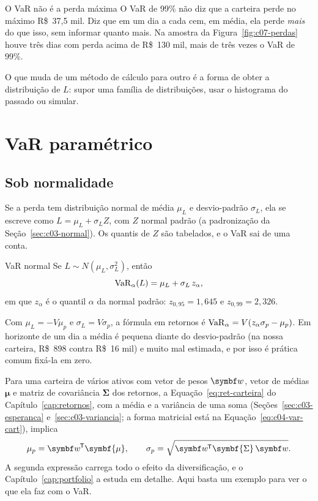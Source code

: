 \begin{armadilha}{O VaR não é a perda máxima}
O VaR de 99\% não diz que a carteira perde no máximo R\$~37,5 mil. Diz que em um dia a cada cem, em média, ela perde \emph{mais} do que isso, sem informar quanto mais. Na amostra da Figura~\ref{fig:c07-perdas} houve três dias com perda acima de R\$~130 mil, mais de três vezes o VaR de 99\%.
\end{armadilha}

O que muda de um método de cálculo para outro é a forma de obter a distribuição de $L$: supor uma família de distribuições, usar o histograma do passado ou simular.

\section{VaR paramétrico}
\label{sec:c07-param}

\subsection{Sob normalidade}

Se a perda tem distribuição normal de média $\mu_L$ e desvio-padrão $\sigma_L$, ela se escreve como $L = \mu_L + \sigma_L Z$, com $Z$ normal padrão (a padronização da Seção~\ref{sec:c03-normal}). Os quantis de $Z$ são tabelados, e o VaR sai de uma conta.

\begin{resultado}{VaR normal}
Se $L \sim N(\mu_L, \sigma_L^2)$, então
\begin{equation}
  \operatorname{VaR}_\alpha(L) = \mu_L + \sigma_L\, z_\alpha ,
  \label{eq:c07-var-normal}
\end{equation}
em que $z_\alpha$ é o quantil $\alpha$ da normal padrão: $z_{0,95} = 1,645$ e $z_{0,99} = 2,326$.
\end{resultado}

Com $\mu_L = -V\mu_p$ e $\sigma_L = V\sigma_p$, a fórmula em retornos é $\operatorname{VaR}_\alpha = V(z_\alpha \sigma_p - \mu_p)$. Em horizonte de um dia a média é pequena diante do desvio-padrão (na nossa carteira, R\$~898 contra R\$~16 mil) e muito mal estimada, e por isso é prática comum fixá-la em zero.

Para uma carteira de vários ativos com vetor de pesos $\vetor{w}$, vetor de médias $\symbf{\mu}$ e matriz de covariância $\symbf{\Sigma}$ dos retornos, a Equação~\eqref{eq:ret-carteira} do Capítulo~\ref{cap:retornos}, com a média e a variância de uma soma (Seções~\ref{sec:c03-esperanca} e~\ref{sec:c03-variancia}; a forma matricial está na Equação~\eqref{eq:c04-var-cart}), implica
\begin{equation}
  \mu_p = \vetor{w}\T \symbf{\mu} , \qquad \sigma_p = \sqrt{\vetor{w}\T \symbf{\Sigma}\, \vetor{w}} .
  \label{eq:c07-sigma-p}
\end{equation}
A segunda expressão carrega todo o efeito da diversificação, e o Capítulo~\ref{cap:portfolio} a estuda em detalhe. Aqui basta um exemplo para ver o que ela faz com o VaR.

